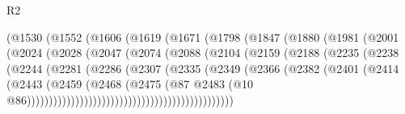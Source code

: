 \begin{lexlean}{R2}
\begin{coremodule}
{{{{{{{{{{{{{{{{{{{{{{{{{{{{{{{{{{{{{{{{{{{{{{{{{{{{{{{{{{{{{{{{{{{{{{{{{{{{{{{{{{{{{{{{{{{{{{{{{{{{{{{{{{{{{{{{{{{{{{{{{{{{{{{{{{{{{{{{{{{{                          (@1530
                            (@1552
                              (@1606
                                (@1619
                                  (@1671
                                    (@1798
                                      (@1847
                                        (@1880
                                          (@1981
                                            (@2001
                                              (@2024
                                                (@2028
                                                  (@2047
                                                    (@2074
                                                      (@2088
                                                        (@2104
                                                          (@2159
                                                            (@2188
                                                              (@2235
                                                                (@2238
                                                                  (@2244
                                                                    (@2281
                                                                      (@2286
                                                                        (@2307
                                                                          (@2335
                                                                            (@2349
                                                                              (@2366
                                                                                (@2382
                                                                                  (@2401
                                                                                    (@2414
                                                                                      (@2443
                                                                                        (@2459
                                                                                          (@2468
                                                                                            (@2475
                                                                                              (@87
                                                                                                @2483
                                                                                                (@10
                                                                                                  @86)))))))))))))))))))))))))))))))))))))))))))))))
}}}}}}}}}}}}}}}}}}}}}}}}}}}}}}}}}}}}}}}}}}}}}}}}}}}}}}}}}}}}}}}}}}}}}}}}}}}}}}}}}}}}}}}}}}}}}}}}}}}}}}}}}}}}}}}}}}}}}}}}}}}}}}}}}}}}}}}}}}}}
\end{coremodule}
\end{lexlean}
